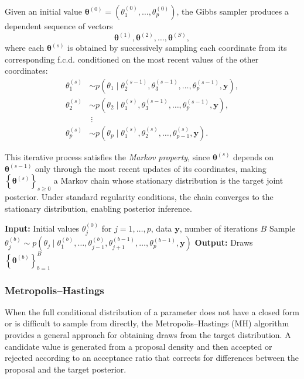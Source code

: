 Given an initial value $\bm{\theta}^{(0)} = \left( \theta_1^{(0)}, \ldots, \theta_p^{(0)} \right)$, the Gibbs sampler produces a dependent sequence of vectors
$$
\bm{\theta}^{(1)}, \bm{\theta}^{(2)}, \ldots, \bm{\theta}^{(S)},
$$
where each $\bm{\theta}^{(s)}$ is obtained by successively sampling each coordinate from its corresponding f.c.d. conditioned on the most recent values of the other coordinates:
\begin{align*}
\theta_1^{(s)} &\sim p\left(\theta_1 \mid \theta_2^{(s-1)}, \theta_3^{(s-1)}, \ldots, \theta_p^{(s-1)}, \bm{y}\right), \\
\theta_2^{(s)} &\sim p\left(\theta_2 \mid \theta_1^{(s)}, \theta_3^{(s-1)}, \ldots, \theta_p^{(s-1)}, \bm{y}\right), \\
&\ \vdots \\
\theta_p^{(s)} &\sim p\left(\theta_p \mid \theta_1^{(s)}, \theta_2^{(s)}, \ldots, \theta_{p-1}^{(s)}, \bm{y}\right).
\end{align*}

This iterative process satisfies the \textit{Markov property}, since $\bm{\theta}^{(s)}$ depends on $\bm{\theta}^{(s-1)}$ only through the most recent updates of its coordinates, making $\left\{\bm{\theta}^{(s)}\right\}_{s \ge 0}$ a Markov chain whose stationary distribution is the target joint posterior. Under standard regularity conditions, the chain converges to the stationary distribution, enabling posterior inference.

\begin{algorithm}[H]
\caption{Gibbs Sampling}
\begin{algorithmic}
\State \textbf{Input:} Initial values $\theta_j^{(0)}$ for $j = 1,\dots,p$, data $\bm{y}$, number of iterations $B$
    \State Sample $\theta_j^{(b)} \sim p\left(\theta_j \mid \theta_1^{(b)}, \ldots, \theta_{j-1}^{(b)}, \theta_{j+1}^{(b-1)}, \ldots, \theta_p^{(b-1)}, \bm{y}\right)$
  \EndFor
\EndFor
\State \textbf{Output:} Draws $\left\{\bm{\theta}^{(b)}\right\}_{b=1}^B$
\end{algorithmic}
\end{algorithm}



\subsubsection{Metropolis--Hastings}

When the full conditional distribution of a parameter does not have a closed form or is difficult to sample from directly, the Metropolis--Hastings (MH) algorithm provides a general approach for obtaining draws from the target distribution. A candidate value is generated from a proposal density and then accepted or rejected according to an acceptance ratio that corrects for differences between the proposal and the target posterior.


